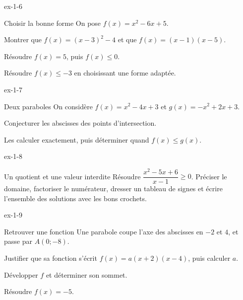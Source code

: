 \clearpage
{}
\begin{blocLivre}{ex-1-6}
\begin{exercice}[2]{Choisir la bonne forme}
On pose $f(x)=x^2-6x+5$.
\begin{questions}
\item Montrer que $f(x)=(x-3)^2-4$ et que $f(x)=(x-1)(x-5)$.
\item Résoudre $f(x)=5$, puis $f(x)\leq0$.
\item Résoudre $f(x)\leq-3$ en choisissant une forme adaptée.
\end{questions}
\end{exercice}
\end{blocLivre}
\begin{blocLivre}{ex-1-7}
\begin{exercice}[2]{Deux paraboles}
On considère $f(x)=x^2-4x+3$ et $g(x)=-x^2+2x+3$.
\begin{center}\end{center}
\begin{questions}
\item Conjecturer les abscisses des points d'intersection.
\item Les calculer exactement, puis déterminer quand $f(x)\leq g(x)$.
\end{questions}
\end{exercice}
\end{blocLivre}
\begin{blocLivre}{ex-1-8}
\begin{exercice}[2]{Un quotient et une valeur interdite}
Résoudre $\dfrac{x^2-5x+6}{x-1}\geq0$.
Préciser le domaine, factoriser le numérateur, dresser un tableau de signes
et écrire l'ensemble des solutions avec les bons crochets.
\end{exercice}
\end{blocLivre}
\begin{blocLivre}{ex-1-9}
\begin{exercice}[2]{Retrouver une fonction}
Une parabole coupe l'axe des abscisses en $-2$ et $4$, et passe par $A(0;-8)$.
\begin{questions}
\item Justifier que sa fonction s'écrit $f(x)=a(x+2)(x-4)$, puis calculer $a$.
\item Développer $f$ et déterminer son sommet.
\item Résoudre $f(x)=-5$.
\end{questions}
\label{figlivre-r01-09-parabole-ex}

\end{exercice}
\end{blocLivre}
